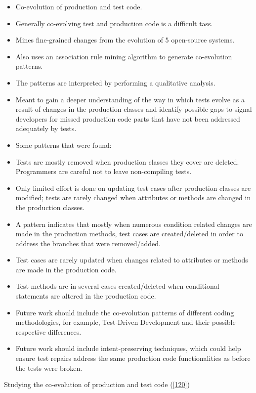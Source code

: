 \documentclass[]{book}
\providecommand{\tightlist}{%
  \setlength{\itemsep}{0pt}\setlength{\parskip}{0pt}}
\begin{document}
\begin{itemize}
\tightlist
\item
  Co-evolution of production and test code.
\item
  Generally co-evolving test and production code is a difficult tass.
\item
  Mines fine-grained changes from the evolution of 5 open-source
  systems.
\item
  Also uses an association rule mining algorithm to generate
  co-evolution patterns.
\item
  The patterns are interpreted by performing a qualitative analysis.
\item
  Meant to gain a deeper understanding of the way in which tests evolve
  as a result of changes in the production classes and identify possible
  gaps to signal developers for missed production code parts that have
  not been addressed adequately by tests.
\item
  Some patterns that were found:
\item
  Tests are mostly removed when production classes they cover are
  deleted. Programmers are careful not to leave non-compiling tests.
\item
  Only limited effort is done on updating test cases after production
  classes are modified; tests are rarely changed when attributes or
  methods are changed in the production classes.
\item
  A pattern indicates that mostly when numerous condition related
  changes are made in the production methods, test cases are
  created/deleted in order to address the branches that were
  removed/added.
\item
  Test cases are rarely updated when changes related to attributes or
  methods are made in the production code.
\item
  Test methods are in several cases created/deleted when conditional
  statements are altered in the production code.
\item
  Future work should include the co-evolution patterns of different
  coding methodologies, for example, Test-Driven Development and their
  possible respective differences.
\item
  Future work should include intent-preserving techniques, which could
  help ensure test repairs address the same production code
  functionalities as before the tests were broken.
\end{itemize}

Studying the co-evolution of production and test code
({[}\protect\hyperlink{ref-zaidman2011studying}{120}{]})
\end{document}
